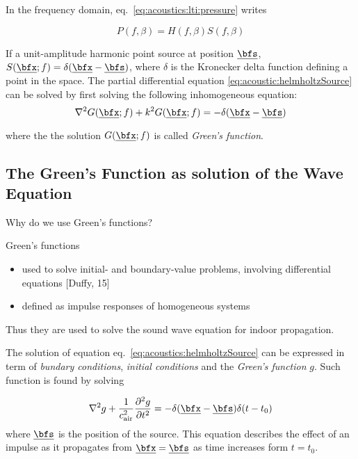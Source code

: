 In the frequency domain, eq.~\cref{eq:acoustics:lti:pressure} writes

\begin{equation}
    P(f, \beta) = H(f, \beta) S(f, \beta)
\end{equation}


If a unit-amplitude harmonic point source at position $\positionSource$, $S(\positionMicrophone ; f) = \delta(\positionMicrophone - \positionSource)$,
where $\delta$ is the Kronecker delta function defining a point in the space.
The partial differential equation \cref{eq:acoustic:helmholtzSource} can be solved by first solving the following inhomogeneous equation:
\begin{equation}
    \knabla^2 G(\positionMicrophone ; f) + k^2 G(\positionMicrophone ; f) = - \delta(\positionMicrophone - \positionSource)
\end{equation}

where the the solution $G(\positionMicrophone ; f)$ is called \textit{Green's function}.

\subsection{The Green's Function as solution of the Wave Equation}

Why do we use Green's functions?

Green's functions
\begin{itemize}
    \item used to solve initial- and boundary-value problems, involving differential equations [Duffy, 15]
    \item defined as impulse responses of homogeneous systems
\end{itemize}
Thus they are used to solve the sound wave equation for indoor propagation.

The solution of equation eq.~\cref{eq:acoustics:helmholtzSource} can be expressed in term of \textit{bundary conditions},
\textit{initial conditions} and the \textit{Green's function} $g$.
Such function is found by solving

\begin{equation}
    \knabla^2 g + \frac{1}{\cair^2} \kpderiv[2]{g}{t} = - \delta(\positionMicrophone - \positionSource)\delta(t - t_0)
\end{equation}
where $\positionSource$ is the position of the source.
This equation describes the effect of an impulse as it propagates from $\positionMicrophone=\positionSource$ as time increases form $t = t_0$.




